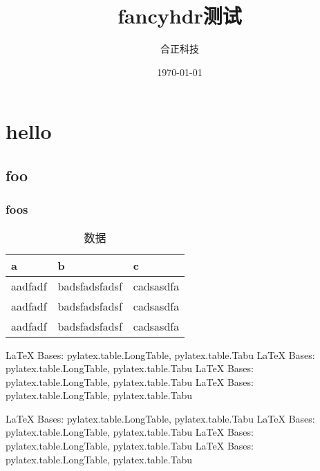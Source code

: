 \documentclass{report}
\title{fancyhdr测试}
\author{合正科技}
\date{\today}
\begin{document}
\maketitle

\chapter{hello}
\section{foo}
\subsection{foos}

\begin{table}[h!]
   \caption{数据}
   \label{tbl:data}
   \centering
   \begin{tabu} to 0.5\textwidth {X[l]X[2,c]X[r]}
   \toprule
   a & b & c\\
   \midrule
   aadfadf & badsfadsfadsf & cadsasdfa\\
   aadfadf & badsfadsfadsf & cadsasdfa\\
   aadfadf & badsfadsfadsf & cadsasdfa\\
   \bottomrule
   \end{tabu}
\end{table}

\LaTeX{} Bases: pylatex.table.LongTable, pylatex.table.Tabu
\LaTeX{} Bases: pylatex.table.LongTable, pylatex.table.Tabu
\LaTeX{} Bases: pylatex.table.LongTable, pylatex.table.Tabu
\LaTeX{} Bases: pylatex.table.LongTable, pylatex.table.Tabu
\newpage

\LaTeX{} Bases: pylatex.table.LongTable, pylatex.table.Tabu
\LaTeX{} Bases: pylatex.table.LongTable, pylatex.table.Tabu
\LaTeX{} Bases: pylatex.table.LongTable, pylatex.table.Tabu
\LaTeX{} Bases: pylatex.table.LongTable, pylatex.table.Tabu
\end{document}
